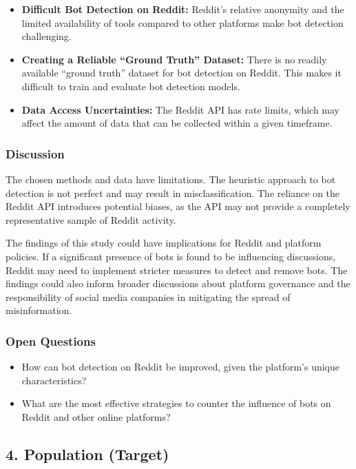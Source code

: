 \documentclass[
  letterpaper,
  DIV=11,
  numbers=noendperiod]{scrartcl}
\providecommand{\tightlist}{%
  \setlength{\itemsep}{0pt}\setlength{\parskip}{0pt}}\usepackage{longtable,booktabs,array}
\begin{document}
\begin{itemize}
\tightlist
\item
  \textbf{Difficult Bot Detection on Reddit:} Reddit's relative
  anonymity and the limited availability of tools compared to other
  platforms make bot detection challenging.
\item
  \textbf{Creating a Reliable ``Ground Truth'' Dataset:} There is no
  readily available ``ground truth'' dataset for bot detection on
  Reddit. This makes it difficult to train and evaluate bot detection
  models.
\item
  \textbf{Data Access Uncertainties:} The Reddit API has rate limits,
  which may affect the amount of data that can be collected within a
  given timeframe.
\end{itemize}

\subsubsection{Discussion}\label{discussion}

The chosen methods and data have limitations. The heuristic approach to
bot detection is not perfect and may result in misclassification. The
reliance on the Reddit API introduces potential biases, as the API may
not provide a completely representative sample of Reddit activity.

The findings of this study could have implications for Reddit and
platform policies. If a significant presence of bots is found to be
influencing discussions, Reddit may need to implement stricter measures
to detect and remove bots. The findings could also inform broader
discussions about platform governance and the responsibility of social
media companies in mitigating the spread of misinformation.

\subsubsection{Open Questions}\label{open-questions}

\begin{itemize}
\tightlist
\item
  How can bot detection on Reddit be improved, given the platform's
  unique characteristics?
\item
  What are the most effective strategies to counter the influence of
  bots on Reddit and other online platforms?
\end{itemize}

\subsection{4. Population (Target)}\label{population-target}
\end{document}
